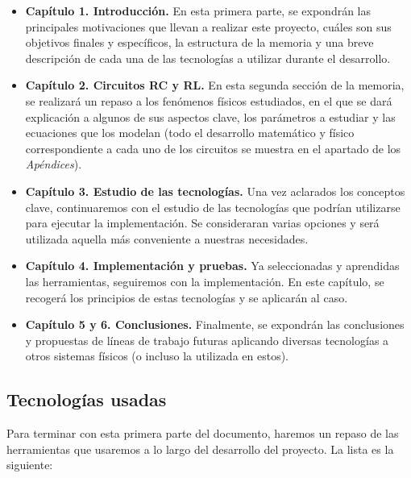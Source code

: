 \documentclass[../main.tex]{subfiles}
\begin{document}
\begin{itemize}
    \item \textbf{Capítulo 1. Introducción. } En esta primera parte, se expondrán las principales motivaciones que llevan a realizar este proyecto, cuáles son sus objetivos finales y específicos, la estructura de la memoria y una breve descripción de cada una de las tecnologías a utilizar durante  el desarrollo.
    \item \textbf{Capítulo 2. Circuitos RC y RL. } En esta segunda sección de la memoria, se realizará un repaso a los fenómenos físicos estudiados, en el que se dará explicación a algunos de sus aspectos clave, los parámetros a estudiar y las ecuaciones que los modelan (todo el desarrollo matemático y físico correspondiente a cada uno de los circuitos se muestra en el apartado de los \textit{Apéndices}).
    \item \textbf{Capítulo 3. Estudio de las tecnologías.} Una vez aclarados los conceptos clave, continuaremos con el estudio de las tecnologías que podrían utilizarse para ejecutar la implementación. Se consideraran varias opciones y será utilizada aquella más conveniente a nuestras necesidades.
    \item \textbf{Capítulo 4. Implementación y pruebas.} Ya seleccionadas y aprendidas las herramientas, seguiremos con la implementación. En este capítulo, se recogerá los principios de estas tecnologías y se aplicarán al caso.
    \item \textbf{Capítulo 5 y 6. Conclusiones. }Finalmente, se expondrán las conclusiones y propuestas de líneas de trabajo futuras aplicando diversas tecnologías a otros sistemas físicos (o incluso la utilizada en estos).
\end{itemize}

\subsection{Tecnologías usadas}
Para terminar con esta primera parte del documento, haremos un repaso de las herramientas que usaremos a lo largo del desarrollo del proyecto. La lista es la siguiente:
\end{document}
